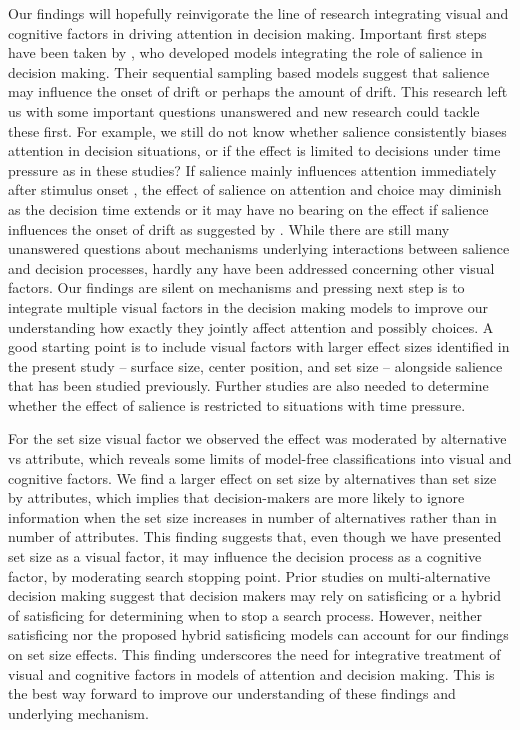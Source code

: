 \documentclass[english,natbib,man,floatsintext]{apa6}
\begin{document}
Our findings will hopefully reinvigorate the line of research integrating visual and cognitive factors in driving attention in decision making. Important first steps have been taken by \cite{chen2013, navalpakkam2010, towal2013a}, who developed models integrating the role of salience in decision making. Their sequential sampling based models suggest that salience may influence the onset of drift or perhaps the amount of drift. This research left us with some important questions unanswered and new research could tackle these first. For example, we still do not know whether salience consistently biases attention in decision situations, or if the effect is limited to decisions under time pressure as in these studies? If salience mainly influences attention immediately after stimulus onset \citep{theeuwes2010, orquin2015a}, the effect of salience on attention and choice may diminish as the decision time extends or it may have no bearing on the effect if salience influences the onset of drift as suggested by \cite{chen2013}. While there are still many unanswered questions about mechanisms underlying interactions between salience and decision processes, hardly any have been addressed concerning other visual factors. Our findings are silent on mechanisms and pressing next step is to integrate multiple visual factors in the decision making models to improve our understanding how exactly they jointly affect attention and possibly choices. A good starting point is to include visual factors with larger effect sizes identified in the present study -- surface size, center position, and set size -- alongside salience that has been studied previously. Further studies are also needed to determine whether the effect of salience is restricted to situations with time pressure.     


For the set size visual factor we observed the effect was moderated by alternative vs attribute, which reveals some limits of model-free classifications into visual and cognitive factors. We find a larger effect on set size by alternatives than set size by attributes, which implies that decision-makers are more likely to ignore information when the set size increases in number of alternatives rather than in number of attributes. This finding suggests that, even though we have presented set size as a visual factor, it may influence the decision process as a cognitive factor, by moderating search stopping point. Prior studies on multi-alternative decision making \cite{reutskaja2011, stuttgen2012, thomas2020} suggest that decision makers may rely on satisficing or a hybrid of satisficing for determining when to stop a search process. However, neither satisficing nor the proposed hybrid satisficing models can account for our findings on set size effects. This finding underscores the need for integrative treatment of visual and cognitive factors in models of attention and decision making. This is the best way forward to improve our understanding of these findings and underlying mechanism.
\end{document}
